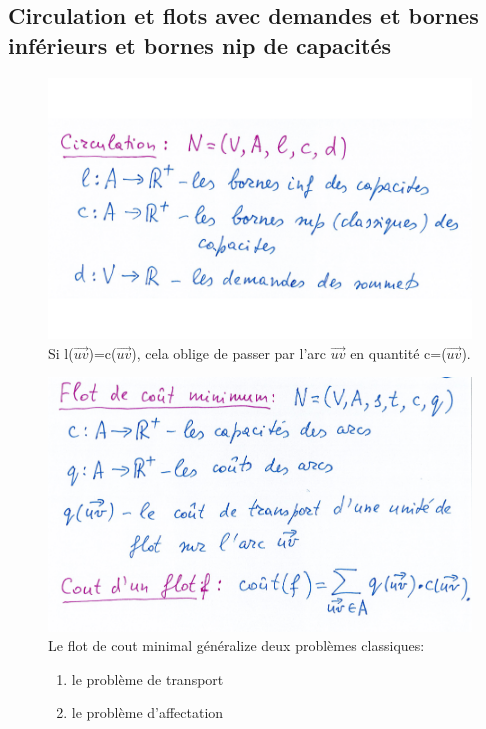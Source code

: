 \subsection{Circulation et flots avec demandes et bornes inférieurs et bornes nip de capacités}
\begin{figure}[!ht]
	\includegraphics[width=\linewidth,height=0.75\textheight]{notes/algorithme/circu_flot.png}
	Si l($\overrightarrow{uv}$)=c($\overrightarrow{uv}$), cela oblige de passer par l'arc $\overrightarrow{uv}$ en
	quantité c=($\overrightarrow{uv}$).
\end{figure}
\begin{figure}[!ht]
	\includegraphics[width=\linewidth,height=0.75\textheight]{notes/algorithme/flot_min.png}
	Le flot de cout minimal généralize deux problèmes classiques:
	\begin{enumerate}
		\item le problème de transport
		\item le problème d'affectation
	\end{enumerate}
\end{figure}
